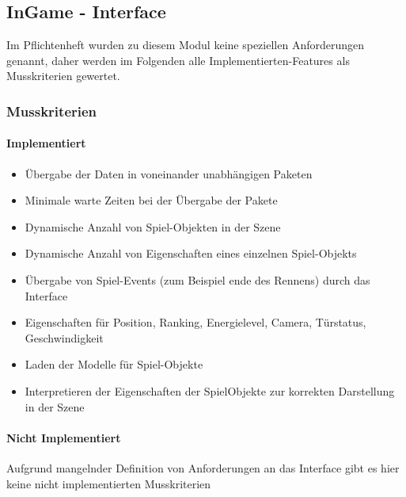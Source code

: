 \subsection{InGame - Interface}
Im Pflichtenheft wurden zu diesem Modul keine speziellen Anforderungen genannt, daher
werden im Folgenden alle Implementierten-Features als Musskriterien gewertet.

\subsubsection{Musskriterien}
\paragraph{Implementiert}
\begin{itemize}
    \item Übergabe der Daten in voneinander unabhängigen Paketen
    \item Minimale warte Zeiten bei der Übergabe der Pakete
    \item Dynamische Anzahl von Spiel-Objekten in der Szene
    \item Dynamische Anzahl von Eigenschaften eines einzelnen Spiel-Objekts
    \item Übergabe von Spiel-Events (zum Beispiel ende des Rennens) durch das Interface

    \item Eigenschaften für Position, Ranking, Energielevel, Camera, Türstatus, Geschwindigkeit

    \item Laden der Modelle für Spiel-Objekte
    \item Interpretieren der Eigenschaften der SpielObjekte zur korrekten Darstellung in der Szene
\end{itemize}

\paragraph{Nicht Implementiert}
Aufgrund mangelnder Definition von Anforderungen an das Interface gibt es hier keine nicht implementierten
Musskriterien